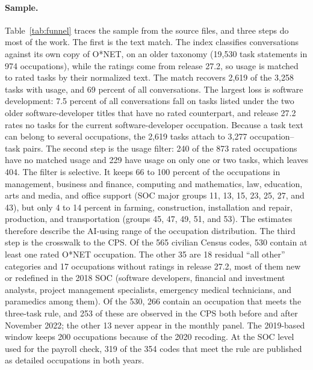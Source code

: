 \documentclass[12pt]{article}
\theoremstyle{plain}
\theoremstyle{definition}
\theoremstyle{remark}
\begin{document}
\paragraph{Sample.}
Table~\ref{tab:funnel} traces the sample from the source files, and three
steps do most of the work. The first is the text match. The index
classifies conversations against its own copy of O*NET, on an older
taxonomy (19,530 task statements in 974 occupations), while the ratings
come from release 27.2, so usage is matched to rated tasks by their
normalized text. The match recovers 2,619 of the 3,258 tasks with usage,
and 69 percent of all conversations. The largest loss is software
development: 7.5 percent of all conversations fall on tasks listed under
the two older software-developer titles that have no rated counterpart,
and release 27.2 rates no tasks for the current software-developer
occupation. Because a task text can belong to several occupations, the
2,619 tasks attach to 3,277 occupation--task pairs. The second step is the
usage filter: 240 of the 873 rated occupations have no matched usage and
229 have usage on only one or two tasks, which leaves 404. The filter is
selective. It keeps 66 to 100 percent of the occupations in management,
business and finance, computing and mathematics, law, education, arts and
media, and office support (SOC major groups 11, 13, 15, 23, 25, 27, and
43), but only 4 to 14 percent in farming, construction, installation and
repair, production, and transportation (groups 45, 47, 49, 51, and 53).
The estimates therefore describe the AI-using range of the occupation
distribution. The third step is the crosswalk to the CPS. Of the 565
civilian Census codes, 530 contain at least one rated O*NET occupation.
The other 35 are 18 residual ``all other'' categories and 17 occupations
without ratings in release 27.2, most of them new or redefined in the
2018 SOC (software developers, financial and investment analysts, project
management specialists, emergency medical technicians, and paramedics
among them). Of the 530, 266 contain an occupation that meets the
three-task rule, and 253 of these are observed in the CPS both before and
after November 2022; the other 13 never appear in the monthly panel. The
2019-based window keeps 200 occupations because of the 2020 recoding. At
the SOC level used for the payroll check, 319 of the 354 codes that meet
the rule are published as detailed occupations in both years.
\end{document}
